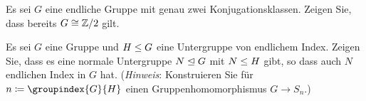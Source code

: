 \documentclass[a4paper, 10pt]{scrartcl}
\begin{document}
\begin{question}
  Es sei $G$ eine endliche Gruppe mit genau zwei Konjugationsklassen.
  Zeigen Sie, dass bereits $G \cong \mathbb{Z}/2$ gilt.
\end{question}

\begin{question}
  Es sei $G$ eine Gruppe und $H \mathrel{\leq} G$ eine Untergruppe von endlichem Index.
  Zeigen Sie, dass es eine normale Untergruppe $N \mathrel{\trianglelefteq} G$ mit $N \mathrel{\leq} H$ gibt, so dass auch $N$ endlichen Index in $G$ hat.
  \newline
  (\emph{Hinweis}:
  Konstruieren Sie für $n \defined \groupindex{G}{H}$ einen Gruppenhomomorphismus $G \to S_n$.)
\end{question}

\end{document}
